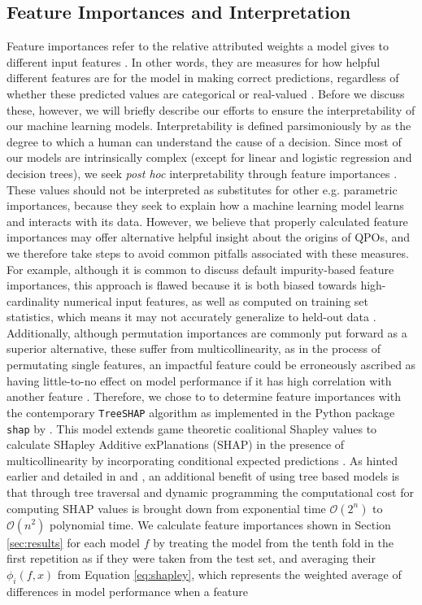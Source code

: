 \documentclass[fleqn,usenatbib,twocolumn]{mnras}%
\begin{document}
\subsection{Feature Importances and Interpretation}\label{sec:feature_imps}

Feature importances refer to the relative attributed weights a model gives to different input features \citep{Saarela2021ComparisonOF}. In other words, they are measures for how helpful different features are for the model in making correct predictions, regardless of whether these predicted values are categorical or real-valued \citep{generalPermutations}. Before we discuss these, however, we will briefly describe our efforts to ensure the interpretability of our machine learning models. Interpretability is defined parsimoniously by \cite{tim-miller-interpretability} as the degree to which a human can understand the cause of a decision. Since most of our models are intrinsically complex (except for linear and logistic regression and decision trees), we seek \textit{post hoc} interpretability through feature importances \citep{post-hoc}. These values should not be interpreted as substitutes for other e.g. parametric importances, because they seek to explain how a machine learning model learns and interacts with its data. However, we believe that properly calculated feature importances may offer alternative helpful insight about the origins of QPOs, and we therefore take steps to avoid common pitfalls associated with these measures. For example, although it is common to discuss default impurity-based feature importances, this approach is flawed because it is both biased towards high-cardinality numerical input features, as well as computed on training set statistics, which means it may not accurately generalize to held-out data \citep{scikit-learn}. Additionally, although permutation importances are commonly put forward as a superior alternative, these suffer from multicollinearity, as in the process of permutating single features, an impactful feature could be erroneously ascribed as having little-to-no effect on model performance if it has high correlation with another feature \citep{Strobl2007,Nicodemus2010,hooker2019}. Therefore, we chose to to determine feature importances with the contemporary \texttt{TreeSHAP} algorithm as implemented in the Python package \texttt{shap} by \cite{SHAP2017}. This model extends game theoretic coalitional Shapley values to calculate SHapley Additive exPlanations (SHAP) in the presence of multicollinearity by incorporating conditional expected predictions \citep{shapleyvaluesoriginal,SHAP2017,molnar2022}. As hinted earlier and detailed in \cite{SHAP2017} and \cite{molnar2022}, an additional benefit of using tree based models is that through tree traversal and dynamic programming the computational cost for computing SHAP values is brought down from exponential time $\mathcal{O}(2^n)$ to   $\mathcal{O}(n^2)$ polynomial time. We calculate feature importances shown in Section \ref{sec:results} for each model $f$ by treating the model from the tenth fold in the first repetition as if they were taken from the test set, and averaging their $\phi_i(f,x)$ from Equation \ref{eq:shapley}, which represents the weighted average of differences in model performance when a feature 
\end{document}
